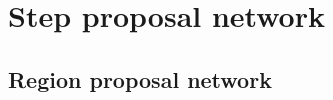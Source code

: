\documentclass[8pt,t,aspectratio=1610]{beamer}
\begin{document}
\section{Step proposal network}


\subsection{Region proposal network}

\end{document}
